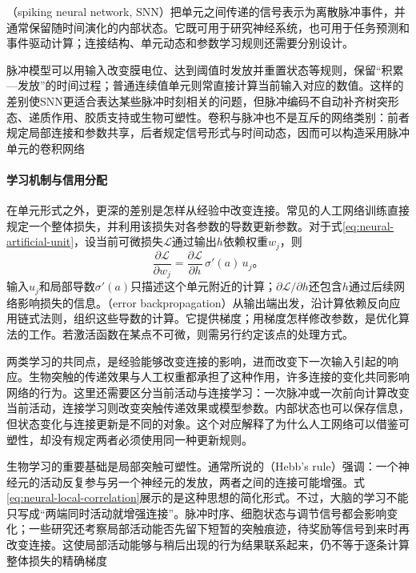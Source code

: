 （spiking neural network, SNN）把单元之间传递的信号表示为离散脉冲事件，并通常保留随时间演化的内部状态。它既可用于研究神经系统，也可用于任务预测和事件驱动计算；连接结构、单元动态和参数学习规则还需要分别设计。

脉冲模型可以用输入改变膜电位、达到阈值时发放并重置状态等规则，保留“积累—发放”的时间过程；普通连续值单元则常直接计算当前输入对应的数值。这样的差别使SNN更适合表达某些脉冲时刻相关的问题，但脉冲编码不自动补齐树突形态、递质作用、胶质支持或生物可塑性。卷积与脉冲也不是互斥的网络类别：前者规定局部连接和参数共享，后者规定信号形式与时间动态，因而可以构造采用脉冲单元的卷积网络

\paragraph{学习机制与信用分配}
在单元形式之外，更深的差别是怎样从经验中改变连接。常见的人工网络训练直接规定一个整体损失，并利用该损失对各参数的导数更新参数。对于式\eqref{eq:neural-artificial-unit}，设当前可微损失$\mathcal{L}$通过输出$h$依赖权重$w_j$，则
\begin{equation}
  \frac{\partial\mathcal{L}}{\partial w_j}
  =\frac{\partial\mathcal{L}}{\partial h}\,\sigma'(a)\,u_j\text{。}
  \label{eq:neural-unit-credit}
\end{equation}
输入$u_j$和局部导数$\sigma'(a)$只描述这个单元附近的计算；$\partial\mathcal{L}/\partial h$还包含$h$通过后续网络影响损失的信息。（error backpropagation）从输出端出发，沿计算依赖反向应用链式法则，组织这些导数的计算。它提供梯度；用梯度怎样修改参数，是优化算法的工作。若激活函数在某点不可微，则需另行约定该点的处理方式。

两类学习的共同点，是经验能够改变连接的影响，进而改变下一次输入引起的响应。生物突触的传递效果与人工权重都承担了这种作用，许多连接的变化共同影响网络的行为。这里还需要区分当前活动与连接学习：一次脉冲或一次前向计算改变当前活动，连接学习则改变突触传递效果或模型参数。内部状态也可以保存信息，但状态变化与连接更新是不同的对象。这个对应解释了为什么人工网络可以借鉴可塑性，却没有规定两者必须使用同一种更新规则。

生物学习的重要基础是局部突触可塑性。通常所说的（Hebb's rule）强调：一个神经元的活动反复参与另一个神经元的发放，两者之间的连接可能增强。式\eqref{eq:neural-local-correlation}展示的是这种思想的简化形式。不过，大脑的学习不能只写成“两端同时活动就增强连接”。脉冲时序、细胞状态与调节信号都会影响变化；一些研究还考察局部活动能否先留下短暂的突触痕迹，待奖励等信号到来时再改变连接。这使局部活动能够与稍后出现的行为结果联系起来，仍不等于逐条计算整体损失的精确梯度

